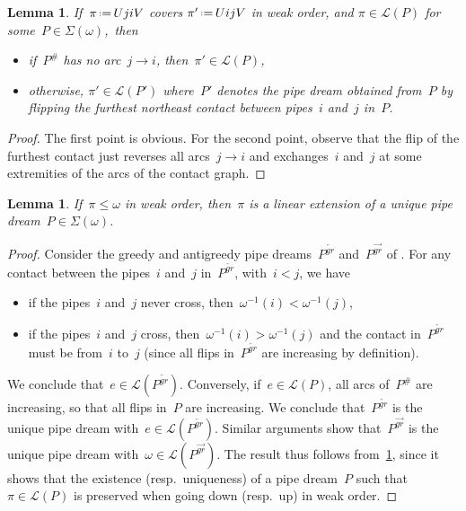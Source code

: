 \documentclass[reqno]{amsart}
\newtheorem{lemma}[theorem]{Lemma}
\theoremstyle{definition}
\newcommand{\eqdef}{\mbox{\,\raisebox{0.2ex}{\scriptsize\ensuremath{\mathrm:}}\ensuremath{=}\,}} %
\newcommand{\contact}{^\#} %
\newcommand{\acyclicPipeDreams}{\Sigma} %
\newcommand{\linearExtensions}{\mathcal{L}} %
\newcommand{\greedyPipeDream}{P^{\overleftarrow{gr}}} %
\newcommand{\antiGreedyPipeDream}{P^{\overrightarrow{gr}}} %
\begin{document}
\begin{lemma}
\label{lem:lowerSetPipeDreams}
If~$\pi \eqdef UjiV$ covers $\pi' \eqdef UijV$ in weak order, and ${\pi \in \linearExtensions(P)}$ for some~${P \in \acyclicPipeDreams(\omega)}$,~then
\begin{itemize}
\item if~$P\contact$ has no arc~$j \to i$, then~$\pi' \in \linearExtensions(P)$,
\item otherwise, $\pi' \in \linearExtensions(P')$ where~$P'$ denotes the pipe dream obtained from~$P$ by flipping the furthest northeast contact between pipes~$i$ and~$j$ in~$P$.
\end{itemize}
\end{lemma}

\begin{proof}
The first point is obvious.
For the second point, observe that the flip of the furthest contact just reverses all arcs~$j \to i$ and exchanges~$i$ and~$j$ at some extremities of the arcs of the contact graph.
\end{proof}

\begin{lemma}
\label{lem:partition}
If~$\pi \le \omega$ in weak order, then~$\pi$ is a linear extension of a unique pipe dream~$P \in \acyclicPipeDreams(\omega)$.
\end{lemma}

\begin{proof}
Consider the greedy and antigreedy pipe dreams~$\greedyPipeDream$ and~$\antiGreedyPipeDream$ of \cite{PilaudPocchiola}.
For any contact between the pipes~$i$ and~$j$ in~$\greedyPipeDream$, with~$i < j$, we have
\begin{itemize}
\item if the pipes~$i$ and~$j$ never cross, then~$\omega^{-1}(i) < \omega^{-1}(j)$,
\item if the pipes~$i$ and~$j$ cross, then~$\omega^{-1}(i) > \omega^{-1}(j)$ and the contact in~$\greedyPipeDream$ must be from~$i$ to~$j$ (since all flips in~$\greedyPipeDream$ are increasing by definition).
\end{itemize}
We conclude that~$e \in \linearExtensions(\greedyPipeDream)$.
Conversely, if~$e \in \linearExtensions(P)$, all arcs of~$P\contact$ are increasing, so that all flips in~$P$ are increasing.
We conclude that~$\greedyPipeDream$ is the unique pipe dream with~$e \in \linearExtensions(\greedyPipeDream)$.
Similar arguments show that~$\antiGreedyPipeDream$ is the unique pipe dream with~$\omega \in \linearExtensions(\antiGreedyPipeDream)$.
The result thus follows from~\cref{lem:lowerSetPipeDreams}, since it shows that the existence (resp.~uniqueness) of a pipe dream~$P$ such that~$\pi \in \linearExtensions(P)$ is preserved when going down (resp.~up) in weak order.
\end{proof}
\end{document}
